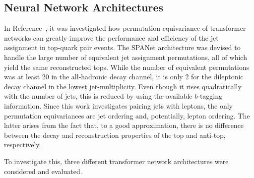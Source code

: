 \subsection{Neural Network Architectures}
\label{sec:nn-architectures}
In Reference~\cite{spanet}, it was investigated how permutation equivariance of transformer networks can greatly improve the performance and efficiency of the jet assignment in top-quark pair events. The SPANet architecture was devised to handle the large number of equivalent jet assignment permutations, all of which yield the same reconstructed tops. While the number of equivalent permutations was at least 20 in the all-hadronic decay channel, it is only 2 for the dileptonic decay channel in the lowest jet-multiplicity. Even though it rises quadratically with the number of jets, this is reduced by using the available $b$-tagging information.
Since this work investigates pairing jets with leptons, the only permutation equivariances are jet ordering and, potentially, lepton ordering. The latter arises from the fact that, to a good approximation, there is no difference between the decay and reconstruction properties of the top and anti-top, respectively.

To investigate this, three different transformer network architectures were considered and evaluated.

